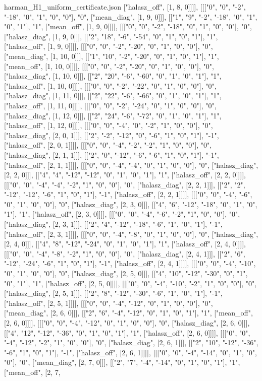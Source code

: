\begin{filecontents*}[overwrite]{harman_H1_uniform_certificate.json}
["halasz_off", [1, 8, 0]]]], [[["0", "0", "-2", "-18", "0", "1", "0", "0"], "0", ["mean_diag", [1, 9, 0]]], [["1", "9", "-2", "-18", "0", "1", "0", "1"], "1", ["mean_off", [1, 9, 0]]]], [[["0", "0", "-2", "-18", "0", "1", "0", "0"], "0", ["halasz_diag", [1, 9, 0]]], [["2", "18", "-6", "-54", "0", "1", "0", "1"], "1", ["halasz_off", [1, 9, 0]]]], [[["0", "0", "-2", "-20", "0", "1", "0", "0"], "0", ["mean_diag", [1, 10, 0]]], [["1", "10", "-2", "-20", "0", "1", "0", "1"], "1", ["mean_off", [1, 10, 0]]]], [[["0", "0", "-2", "-20", "0", "1", "0", "0"], "0", ["halasz_diag", [1, 10, 0]]], [["2", "20", "-6", "-60", "0", "1", "0", "1"], "1", ["halasz_off", [1, 10, 0]]]], [[["0", "0", "-2", "-22", "0", "1", "0", "0"], "0", ["halasz_diag", [1, 11, 0]]], [["2", "22", "-6", "-66", "0", "1", "0", "1"], "1", ["halasz_off", [1, 11, 0]]]], [[["0", "0", "-2", "-24", "0", "1", "0", "0"], "0", ["halasz_diag", [1, 12, 0]]], [["2", "24", "-6", "-72", "0", "1", "0", "1"], "1", ["halasz_off", [1, 12, 0]]]], [[["0", "0", "-4", "0", "-2", "1", "0", "0"], "0", ["halasz_diag", [2, 0, 1]]], [["2", "-2", "-12", "0", "-6", "1", "0", "1"], "-1", ["halasz_off", [2, 0, 1]]]], [[["0", "0", "-4", "-2", "-2", "1", "0", "0"], "0", ["halasz_diag", [2, 1, 1]]], [["2", "0", "-12", "-6", "-6", "1", "0", "1"], "-1", ["halasz_off", [2, 1, 1]]]], [[["0", "0", "-4", "-4", "0", "1", "0", "0"], "0", ["halasz_diag", [2, 2, 0]]], [["4", "4", "-12", "-12", "0", "1", "0", "1"], "1", ["halasz_off", [2, 2, 0]]]], [[["0", "0", "-4", "-4", "-2", "1", "0", "0"], "0", ["halasz_diag", [2, 2, 1]]], [["2", "2", "-12", "-12", "-6", "1", "0", "1"], "-1", ["halasz_off", [2, 2, 1]]]], [[["0", "0", "-4", "-6", "0", "1", "0", "0"], "0", ["halasz_diag", [2, 3, 0]]], [["4", "6", "-12", "-18", "0", "1", "0", "1"], "1", ["halasz_off", [2, 3, 0]]]], [[["0", "0", "-4", "-6", "-2", "1", "0", "0"], "0", ["halasz_diag", [2, 3, 1]]], [["2", "4", "-12", "-18", "-6", "1", "0", "1"], "-1", ["halasz_off", [2, 3, 1]]]], [[["0", "0", "-4", "-8", "0", "1", "0", "0"], "0", ["halasz_diag", [2, 4, 0]]], [["4", "8", "-12", "-24", "0", "1", "0", "1"], "1", ["halasz_off", [2, 4, 0]]]], [[["0", "0", "-4", "-8", "-2", "1", "0", "0"], "0", ["halasz_diag", [2, 4, 1]]], [["2", "6", "-12", "-24", "-6", "1", "0", "1"], "-1", ["halasz_off", [2, 4, 1]]]], [[["0", "0", "-4", "-10", "0", "1", "0", "0"], "0", ["halasz_diag", [2, 5, 0]]], [["4", "10", "-12", "-30", "0", "1", "0", "1"], "1", ["halasz_off", [2, 5, 0]]]], [[["0", "0", "-4", "-10", "-2", "1", "0", "0"], "0", ["halasz_diag", [2, 5, 1]]], [["2", "8", "-12", "-30", "-6", "1", "0", "1"], "-1", ["halasz_off", [2, 5, 1]]]], [[["0", "0", "-4", "-12", "0", "1", "0", "0"], "0", ["mean_diag", [2, 6, 0]]], [["2", "6", "-4", "-12", "0", "1", "0", "1"], "1", ["mean_off", [2, 6, 0]]]], [[["0", "0", "-4", "-12", "0", "1", "0", "0"], "0", ["halasz_diag", [2, 6, 0]]], [["4", "12", "-12", "-36", "0", "1", "0", "1"], "1", ["halasz_off", [2, 6, 0]]]], [[["0", "0", "-4", "-12", "-2", "1", "0", "0"], "0", ["halasz_diag", [2, 6, 1]]], [["2", "10", "-12", "-36", "-6", "1", "0", "1"], "-1", ["halasz_off", [2, 6, 1]]]], [[["0", "0", "-4", "-14", "0", "1", "0", "0"], "0", ["mean_diag", [2, 7, 0]]], [["2", "7", "-4", "-14", "0", "1", "0", "1"], "1", ["mean_off", [2, 7, 
\end{filecontents*}
